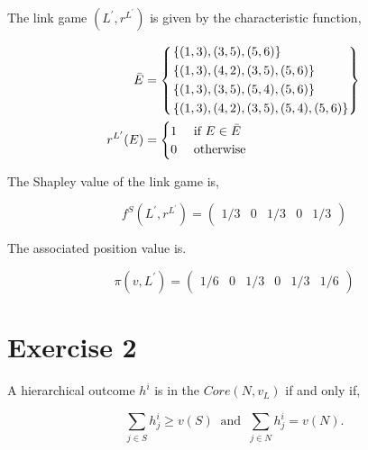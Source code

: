 \documentclass[american]{scrartcl}
\newcommand{\set}[1]{\left\{#1\right\}}
\begin{document}
The link game $(L^\prime, r^{L^\prime})$ is given by the characteristic function,

\begin{equation} \label{value_r}
    \begin{split}
        \bar{E} &=
        \begin{dcases}
            \begin{rcases}
                \set{(1, 3), (3, 5), (5, 6)} \\
                \set{(1, 3), (4, 2), (3, 5), (5, 6)} \\
                \set{(1, 3), (3, 5), (5, 4), (5, 6)} \\
                \set{(1, 3), (4, 2), (3, 5), (5, 4), (5, 6)}
            \end{rcases}
        \end{dcases}\\
        r^{L^\prime}(E) &= \begin{cases}
            1 & \text{ if } E \in \bar{E} \\
            0 & \text{ otherwise }
        \end{cases}
    \end{split}
\end{equation}


The Shapley value of the link game is,

\begin{equation}
    f^{S}(L^\prime, r^{L^\prime}) = \begin{pmatrix}
        1/3 &
        0   &
        1/3 &
        0   &
        1/3
    \end{pmatrix}
\end{equation}


The associated position value is.

\begin{equation}
    \pi(v, L^\prime) = \begin{pmatrix}
        1/6 &
        0   &
        1/3 &
        0   &
        1/3 &
        1/6
    \end{pmatrix}
\end{equation}

\section*{Exercise 2}

A hierarchical outcome $h^i$ is in the $Core(N, v_L)$ if and only if,

\begin{equation*}
    \sum_{j \in S} h^i_j \geq v(S) \ \text{  and  } \
    \sum_{j \in N} h^i_j = v(N).
\end{equation*}
\end{document}
